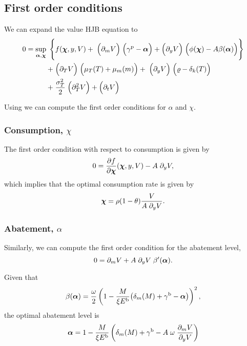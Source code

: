 \documentclass[../../main.tex]{subfiles}
\begin{document}
\subsection{First order conditions}

We can expand the value HJB equation to     
\begin{equation}
    \begin{split}
        0 = \sup_{\bm{\alpha}, \bm{\chi}} \; \Bigg\{ &f(\bm{\chi}, y, V ) + \;
        \Big(\partial_{m} V \Big) \; \Big(\gamma^{\mathrm{p}} - \bm{\alpha} \Big) + \Big(\partial_{y} V \Big) \;  \Big(\phi(\bm{\chi}) - A \beta(\bm{\alpha}) \Big) \Bigg\} \\
        + \; &\Big(\partial_T V \Big) \; \Big(\mu_T(T) + \mu_{m}(m) \Big) + \;
        \Big(\partial_{y} V \Big) \; \Big(\varrho - \delta_k(T) \Big) \\
        + \; &\frac{\sigma_T^2}{2} \; \Big(\partial^2_T V \Big) + \Big(\partial_t V\Big)
    \end{split}
\end{equation}

Using we can compute the first order conditions for $\alpha$ and $\chi$. 


\subsubsection[Consumption]{Consumption, $\chi$}

The first order condition with respect to consumption is given by \begin{equation}
    0 = \frac{\partial f}{\partial \bm{\chi}}(\bm{\chi}, y, V) - A \; \partial_y V,
\end{equation} which implies that the optimal consumption rate is given by \begin{equation}
    \bm{\chi} = \rho (1 - \theta) \frac{V}{A \; \partial_y V}.
\end{equation}

\subsubsection[Abatement]{Abatement, $\alpha$}

Similarly, we can compute the first order condition for the abatement level, \begin{equation}
    0 = \partial_m V + A \; \partial_y V \; \beta^\prime(\bm{\alpha}). 
\end{equation}

Given that \begin{equation}
    \beta(\bm{\alpha}) = \frac{\omega}{2} \left(1 - \frac{M}{\xi  E^{\mathrm{b}}} \big( \delta_m(M) + \gamma^{\mathrm{b}} - \bm{\alpha} \big) \right)^2,  
\end{equation} the optimal abatement level is \begin{equation}
    \bm{\alpha} = 1 - \frac{M}{\xi  E^{\mathrm{b}}} \left( \delta_m(M) + \gamma^{\mathrm{b}} - A \; \omega \; \frac{\partial_m V}{\partial_y V} \right)
\end{equation}
\end{document}

